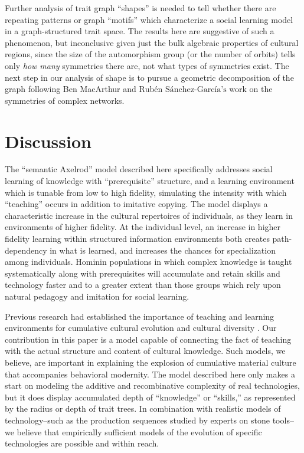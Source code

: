 Further analysis of trait graph ``shapes'' is needed to tell whether
there are repeating patterns or graph ``motifs'' which characterize a
social learning model in a graph-structured trait space. The results
here are suggestive of such a phenomenon, but inconclusive given just
the bulk algebraic properties of cultural regions, since the size of the
automorphism group (or the number of orbits) tells only \emph{how many}
symmetries there are, not what types of symmetries exist. The next step
in our analysis of shape is to pursue a geometric decomposition of the
graph following Ben MacArthur and
$\textrm{Rub\'en S\'anchez-Garc\'ia's}$
\citeyearpar{macarthur2008symmetry} work on the symmetries of complex
networks.

\section{Discussion}\label{discussion}


The ``semantic Axelrod'' model described here specifically addresses
social learning of knowledge with ``prerequisite'' structure, and a
learning environment which is tunable from low to high fidelity,
simulating the intensity with which ``teaching'' occurs in addition to
imitative copying. The model displays a characteristic increase in the
cultural repertoires of individuals, as they learn in environments of
higher fidelity. At the individual level, an increase in higher fidelity
learning within structured information environments both creates
path-dependency in what is learned, and increases the chances for
specialization among individuals. Hominin populations in which complex
knowledge is taught systematically along with prerequisites will
accumulate and retain skills and technology faster and to a greater
extent than those groups which rely upon natural pedagogy and imitation
for social learning.

Previous research had established the importance of teaching and
learning environments for cumulative cultural evolution and cultural
diversity
\citep{Aoki2013Determinants-of, Castro201474, Creanza2013Exploring-Cultu, Nakahashi2013Cultural-Evolut}.
Our contribution in this paper is a model capable of connecting the fact
of teaching with the actual structure and content of cultural knowledge.
Such models, we believe, are important in explaining the explosion of
cumulative material culture that accompanies behavioral modernity. The
model described here only makes a start on modeling the additive and
recombinative complexity of real technologies, but it does display
accumulated depth of ``knowledge'' or ``skills,'' as represented by the
radius or depth of trait trees. In combination with realistic models of
technology--such as the production sequences studied by experts on stone
tools--we believe that empirically sufficient models of the evolution of
specific technologies are possible and within reach.

